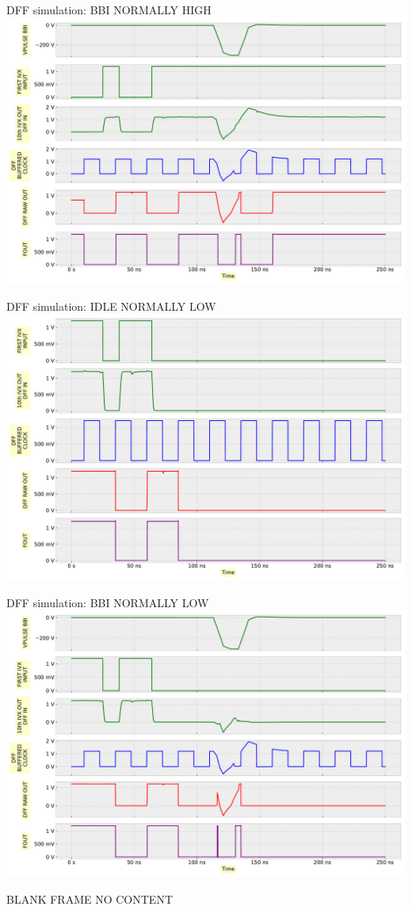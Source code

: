 \begin{frame}{DFF simulation: BBI NORMALLY HIGH}
	\centering
	\vspace{2mm}
	\includegraphics[width=\textwidth]{./figures/DFPX4_bbi_nLow.pdf}
\end{frame}

\begin{frame}{DFF simulation: IDLE NORMALLY LOW}
	\centering
	\vspace{2mm}
	\includegraphics[width=\textwidth]{./figures/DFPX4_idle_nHigh.pdf}
\end{frame}

\begin{frame}{DFF simulation: BBI NORMALLY LOW}
	\centering
	\vspace{2mm}
	\includegraphics[width=\textwidth]{./figures/DFPX4_bbi_nHigh.pdf}
\end{frame}

\begin{frame}{BLANK FRAME}
	NO CONTENT
\end{frame}
